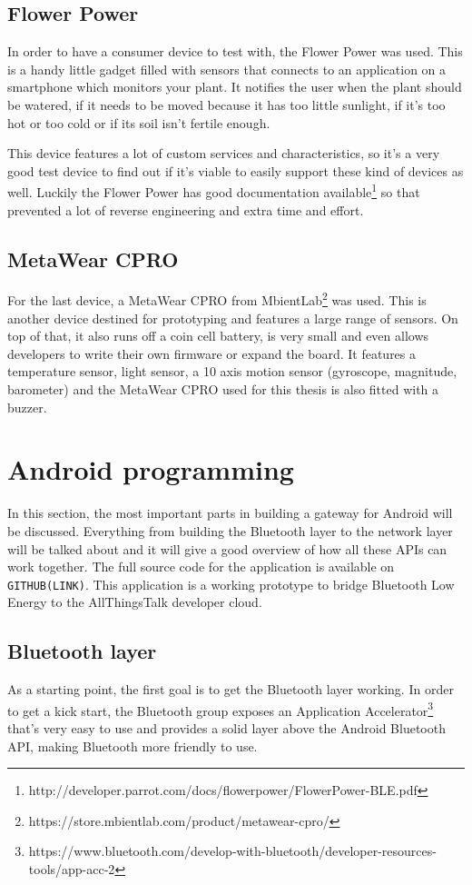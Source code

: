 \documentclass[pdftex,a4paper,12pt,twoside]{report}
\begin{document}
\subsection{Flower Power}
\label{subsec:flowerpower}
In order to have a consumer device to test with, the Flower Power was used. This is a handy little gadget filled with sensors that connects to an application on a smartphone which monitors your plant. It notifies the user when the plant should be watered, if it needs to be moved because it has too little sunlight, if it's too hot or too cold or if its soil isn't fertile enough.

This device features a lot of custom services and characteristics, so it's a very good test device to find out if it's viable to easily support these kind of devices as well. Luckily the Flower Power has good documentation available\footnote{http://developer.parrot.com/docs/flowerpower/FlowerPower-BLE.pdf} so that prevented a lot of reverse engineering and extra time and effort.

\subsection{MetaWear CPRO}
\label{subsec:metawearcpro}
For the last device, a MetaWear CPRO from MbientLab\footnote{https://store.mbientlab.com/product/metawear-cpro/} was used. This is another device destined for prototyping and features a large range of sensors. On top of that, it also runs off a coin cell battery, is very small and even allows developers to write their own firmware or expand the board. It features a temperature sensor, light sensor, a 10 axis motion sensor (gyroscope, magnitude, barometer) and the MetaWear CPRO used for this thesis is also fitted with a buzzer.

\section{Android programming}
\label{sec:androidprogramming}
In this section, the most important parts in building a gateway for Android will be discussed. Everything from building the Bluetooth layer to the network layer will be talked about and it will give a good overview of how all these APIs can work together. The full source code for the application is available on \texttt{GITHUB(LINK)}. This application is a working prototype to bridge Bluetooth Low Energy to the AllThingsTalk developer cloud.

\subsection{Bluetooth layer}
\label{subsec:bluetoothlayer}
As a starting point, the first goal is to get the Bluetooth layer working. In order to get a kick start, the Bluetooth group exposes an Application Accelerator\footnote{https://www.bluetooth.com/develop-with-bluetooth/developer-resources-tools/app-acc-2} that's very easy to use and provides a solid layer above the Android Bluetooth API, making Bluetooth more friendly to use.
\end{document}
